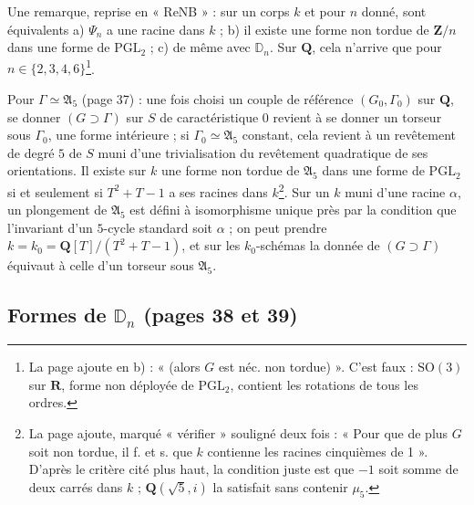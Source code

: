 \documentclass[11pt,a4paper]{article}
\begin{document}
Une remarque, reprise en « ReNB » : sur un corps $k$ et pour $n$ donné, sont
équivalents a) $\Psi_n$ a une racine dans $k$ ; b) il existe une forme non
tordue de $\mathbf{Z}/n$ dans une forme de $\mathrm{PGL}_2$ ; c) de même avec
$\mathbb{D}_n$. Sur $\mathbf{Q}$, cela n'arrive que pour $n \in \{2, 3, 4,
6\}$\footnote{La page ajoute en b) : « (alors $G$ est néc. non tordue) ». C'est
faux : $\mathrm{SO}(3)$ sur $\mathbf{R}$, forme non déployée de
$\mathrm{PGL}_2$, contient les rotations de tous les ordres.}.

Pour $\Gamma \simeq \mathfrak{A}_5$ (page 37) : une fois choisi un couple de
référence $(G_0, \Gamma_0)$ sur $\mathbf{Q}$, se donner $(G \supset \Gamma)$
sur $S$ de caractéristique $0$ revient à se donner un torseur sous
$\Gamma_0$, une forme intérieure ; si $\Gamma_0 \simeq \mathfrak{A}_5$
constant, cela revient à un revêtement de degré $5$ de $S$ muni d'une
trivialisation du revêtement quadratique de ses orientations. Il existe sur
$k$ une forme non tordue de $\mathfrak{A}_5$ dans une forme de $\mathrm{PGL}_2$
si et seulement si $T^2 + T - 1$ a ses racines dans $k$\footnote{La page
ajoute, marqué « vérifier » souligné deux fois : « Pour que de plus $G$ soit
non tordue, il f. et s. que $k$ contienne les racines cinquièmes de 1 ».
D'après le critère cité plus haut, la condition juste est que $-1$ soit somme
de deux carrés dans $k$ ; $\mathbf{Q}(\sqrt5, i)$ la satisfait sans contenir
$\mu_5$.}. Sur un $k$ muni d'une racine $\alpha$, un plongement de
$\mathfrak{A}_5$ est défini à isomorphisme unique près par la condition que
l'invariant d'un $5$-cycle standard soit $\alpha$ ; on peut prendre $k = k_0 =
\mathbf{Q}[T]/(T^2 + T - 1)$, et sur les $k_0$-schémas la donnée de $(G \supset
\Gamma)$ équivaut à celle d'un torseur sous $\mathfrak{A}_5$.

\subsection*{Formes de $\mathbb{D}_n$ (pages 38 et 39)}
\end{document}
